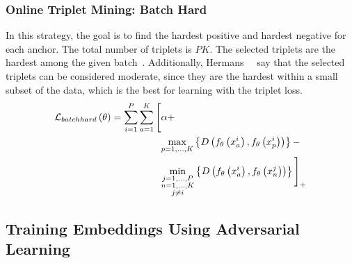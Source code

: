 \subsubsection{Online Triplet Mining: Batch Hard}

In this strategy, the goal is to find the hardest positive and hardest negative for each anchor. The total number of triplets is $PK$. The selected triplets are the hardest among the given batch~\cite{hermans2017triplet}. Additionally, Hermans~\etal{}~\cite{hermans2017triplet} say that the selected triplets can be considered moderate, since they are the hardest within a small subset of the data, which is the best for learning with the triplet loss.
\begin{equation}
    \begin{aligned}
        {\mathcal{L}_{batchhard}} \left( \theta \right) =
        \sum_{i = 1}^P
        \sum_{a = 1}^K
        \Bigg[
            &\alpha +\\
            &\underset{p = 1, \dots, K} {\max}
            \left\{ {
                {D} \left( 
                    {f_\theta} \left( x_a^i \right),
                    {f_\theta} \left( x_p^i \right)
                 \right)
            } \right\} -\\
            &\underset{\substack{j = 1, \dots, P\\n = 1, \dots, K\\j \neq i}} {\min}
            \left\{ {
                {D} \left( 
                    {f_\theta} \left( x_a^i \right),
                    {f_\theta} \left( x_n^j \right)
                 \right)
            } \right\}
        {\Bigg]}_{+}
    \end{aligned}
\end{equation}

\subsection{Training Embeddings Using Adversarial Learning}
\label{ssec:TrainingEmbeddingsAdversarialLearning}

